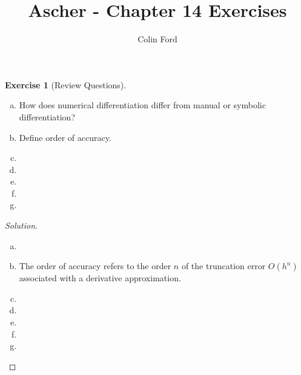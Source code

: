 \documentclass[12pt,a4]{article}
\author{Colin Ford}
\title{Ascher - Chapter 14 Exercises}
\date{}
\theoremstyle{definition}
\newtheorem{exercise}{Exercise}
\begin{document}
\maketitle

\begin{exercise}[Review Questions]
	\begin{enumerate}[(a)]
		\item How does numerical differentiation differ from manual or symbolic differentiation?
		
		\item Define order of accuracy.
		
		\item 
	
		\item 
		
		\item 
		
		\item 
		
		\item 
			
	\end{enumerate}
\end{exercise}
\begin{proof}[Solution]
	\begin{enumerate}[(a)]
		\item 
		
		\item The order of accuracy refers to the order $n$ of the truncation error $O(h^n)$ associated with a derivative approximation. 
		
		\item 
		
		\item 
		
		\item 
		
		\item 
		
		\item 
		
	\end{enumerate}
\end{proof}
\end{document}
